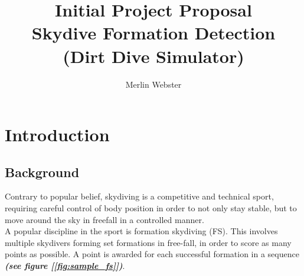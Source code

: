 \documentclass[adpaper,12pt]{book}
\begin{document}
\title{Initial Project Proposal\\Skydive Formation Detection\\ (Dirt Dive Simulator)}
\author{Merlin Webster}
\date{}
\maketitle

\thispagestyle{empty}
\cleardoublepage



\section{Introduction}
	\subsection{Background}
Contrary to popular belief, skydiving is a competitive and technical sport, requiring careful control of body position in order to not only stay stable, but to move around the sky in freefall in a controlled manner.\\
A popular discipline in the sport is formation skydiving (FS). This involves multiple skydivers forming set formations in free-fall, in order to score as many points as possible. A point is awarded for each successful formation in a sequence \textbf{\emph{(see figure [\ref{fig:sample_fs}])}}.
%
\end{document}
